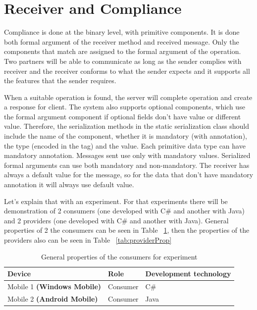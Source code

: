 \section{Receiver and Compliance}
\label{section:compliance}

Compliance is done at the binary level, with primitive components. It is done both formal argument of the receiver method and received message. Only the components that match are assigned to the formal argument of the operation. Two partners will be able to communicate as long as the sender complies with receiver and the receiver conforms to what the sender expects and it supports all the features that the sender requires.

When a suitable operation is found, the server will complete operation and create a response for client. The system also supports optional components, which use the formal argument component if optional fields don't have value or different value. Therefore, the serialization methods in the static serialization class should include the name of the component, whether it is mandatory (with annotation), the type (encoded in the tag) and the value. Each primitive data type can have mandatory annotation. Messages sent use only with mandatory values. Serialized formal arguments can use both mandatory and non-mandatory. The receiver has always a default value for the message, so for the data that don't have mandatory annotation it will always use default value.

Let's explain that with an experiment. For that experiments there will be demonstration of 2 consumers (one developed with C\# and another with Java) and 2 providers (one developed with C\# and another with Java). General properties of 2 the consumers can be seen in Table ~\ref{tab:consumerProp}, then the properties of the providers also can be seen in Table ~\ref{tab:providerProp}


\begin{table}
\centering
\begin{tabular}{ p{5.50cm} p{5.50cm} p{5.50cm}}
\toprule
\multicolumn{1}{l}{\textbf{Device}} & \textbf{Role} & \textbf{Development technology}\\
\midrule
Mobile 1  \textbf{(Windows Mobile)}  & Consumer & C\# \\
\rowcolor{Gray}
Mobile 2  \textbf{(Android  Mobile)} & Consumer & Java \\
\bottomrule
\end{tabular}
\caption[General properties of the consumers for experiment.]{General properties of the consumers for experiment}
\label{tab:consumerProp}
\end{table}

